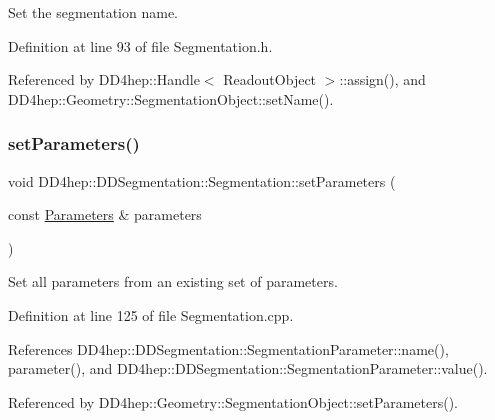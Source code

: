 Set the segmentation name. 



Definition at line 93 of file Segmentation.\+h.



Referenced by D\+D4hep\+::\+Handle$<$ Readout\+Object $>$\+::assign(), and D\+D4hep\+::\+Geometry\+::\+Segmentation\+Object\+::set\+Name().

\hypertarget{class_d_d4hep_1_1_d_d_segmentation_1_1_segmentation_af02e320c944cc14b394f1014a8538cfa}{}\label{class_d_d4hep_1_1_d_d_segmentation_1_1_segmentation_af02e320c944cc14b394f1014a8538cfa} 
\subsubsection{\texorpdfstring{set\+Parameters()}{setParameters()}}
{\footnotesize\ttfamily void D\+D4hep\+::\+D\+D\+Segmentation\+::\+Segmentation\+::set\+Parameters (\begin{DoxyParamCaption}\item[{const \hyperlink{namespace_d_d4hep_1_1_d_d_segmentation_af38026430ca0e1ef64acdfc898f5dd3d}{Parameters} \&}]{parameters }\end{DoxyParamCaption})\hspace{0.3cm}{\ttfamily [virtual]}}



Set all parameters from an existing set of parameters. 



Definition at line 125 of file Segmentation.\+cpp.



References D\+D4hep\+::\+D\+D\+Segmentation\+::\+Segmentation\+Parameter\+::name(), parameter(), and D\+D4hep\+::\+D\+D\+Segmentation\+::\+Segmentation\+Parameter\+::value().



Referenced by D\+D4hep\+::\+Geometry\+::\+Segmentation\+Object\+::set\+Parameters().

\hypertarget{class_d_d4hep_1_1_d_d_segmentation_1_1_segmentation_a5ec5a966ef57fbaf9484c0180aae8a03}{}\label{class_d_d4hep_1_1_d_d_segmentation_1_1_segmentation_a5ec5a966ef57fbaf9484c0180aae8a03} 
